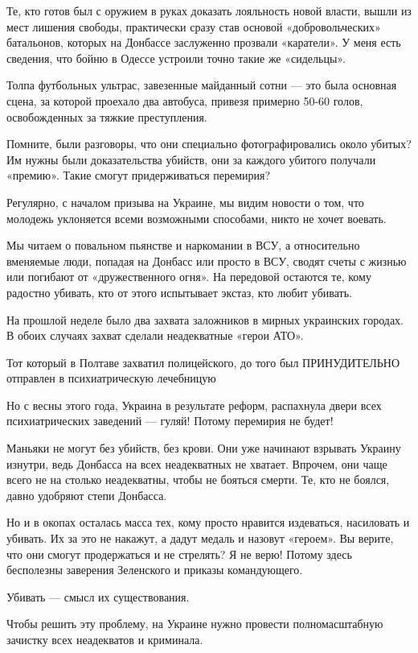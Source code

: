 \documentclass[a4paper,11pt]{extreport}
\begin{document}
Те, кто готов был с оружием в руках доказать лояльность новой власти, вышли из мест лишения свободы, практически сразу став основой «добровольческих» батальонов, которых на Донбассе заслуженно прозвали «каратели».
У меня есть сведения, что бойню в Одессе устроили точно такие же «сидельцы».

Толпа футбольных ультрас, завезенные майданный сотни --- это была основная сцена, за которой проехало два автобуса, привезя примерно 50-60 голов, освобожденных за тяжкие преступления.

Помните, были разговоры, что они специально фотографировались около убитых?
Им нужны были доказательства убийств, они за каждого убитого получали «премию».
Такие смогут придерживаться перемирия?

Регулярно, с началом призыва на Украине, мы видим новости о том, что молодежь уклоняется всеми возможными способами, никто не хочет воевать.

Мы читаем о повальном пьянстве и наркомании в ВСУ, а относительно вменяемые люди, попадая на Донбасс или просто в ВСУ, сводят счеты с жизнью или погибают от «дружественного огня».
На передовой остаются те, кому радостно убивать, кто от этого испытывает экстаз, кто любит убивать.

На прошлой неделе было два захвата заложников в мирных украинских городах.
В обоих случаях захват сделали неадекватные «герои АТО».

Тот который в Полтаве захватил полицейского, до того был ПРИНУДИТЕЛЬНО отправлен в психиатрическую лечебницую

Но с весны этого года, Украина в результате реформ, распахнула двери всех психиатрических заведений --- гуляй!
Потому перемирия не будет!

Маньяки не могут без убийств, без крови. Они уже начинают взрывать Украину изнутри, ведь Донбасса на всех неадекватных не хватает.
Впрочем, они чаще всего не на столько неадекватны, чтобы не бояться смерти.
Те, кто не боялся, давно удобряют степи Донбасса.

Но и в окопах осталась масса тех, кому просто нравится издеваться, насиловать и убивать.
Их за это не накажут, а дадут медаль и назовут «героем».
Вы верите, что они смогут продержаться и не стрелять?
Я не верю!
Потому здесь бесполезны заверения Зеленского и приказы командующего.

Убивать --- смысл их существования.

Чтобы решить эту проблему, на Украине нужно провести полномасштабную зачистку всех неадекватов и криминала.
\end{document}
